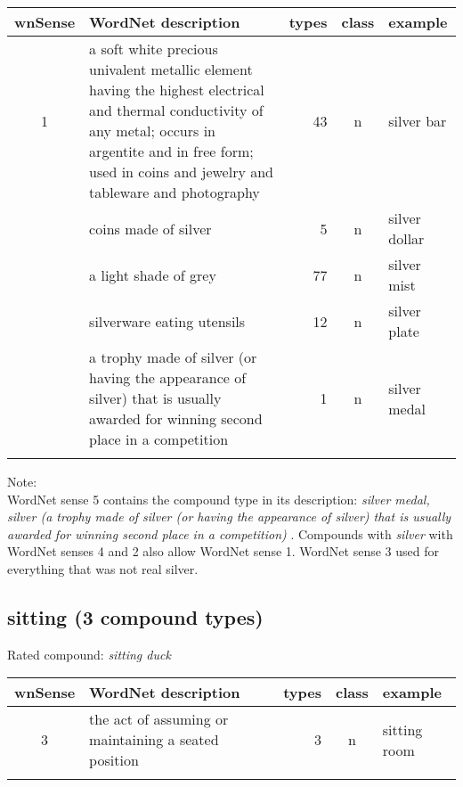 \noindent
\begin{longtable}{c>{\raggedright\arraybackslash}p{5cm}rc>{\raggedright\arraybackslash}p{2cm}}\lsptoprule
{\small wnSense}&WordNet description&types&class&example\\\midrule
1&a soft white precious univalent metallic element having the highest
electrical and thermal conductivity of any metal; occurs in argentite
and in free form; used in coins and jewelry and tableware and
photography&43&n&silver bar\\\tablevspace
2&coins made of silver&5&n&silver dollar\\\tablevspace
3&a light shade of grey&77&n&silver mist\\\tablevspace
4&silverware eating utensils&12&n&silver plate\\\tablevspace
5&a trophy made of silver (or having the appearance of silver) that is
usually awarded for winning second place in a competition&1&n&silver medal\\\lspbottomrule
\end{longtable}

\noindent
Note:\\ 
WordNet sense 5 contains the compound type in its description:
\emph{silver medal, silver (a trophy made of silver (or having the
appearance of silver) that is usually awarded for winning second place
in a competition) 
}. Compounds with \emph{silver} with WordNet senses 4 and 2 also allow
WordNet sense 1.  WordNet sense 3 used for everything that was not
real silver.


\subsection{sitting      (3 compound types)}
Rated compound: \emph{sitting duck}

\vspace*{1ex}

\noindent
\begin{longtable}{c>{\raggedright\arraybackslash}p{5cm}rc>{\raggedright\arraybackslash}p{2cm}}\lsptoprule
{\small wnSense}&WordNet description&types&class&example\\\midrule
3&the act of assuming or maintaining a seated position&3&n&sitting room\\\lspbottomrule
\end{longtable}

